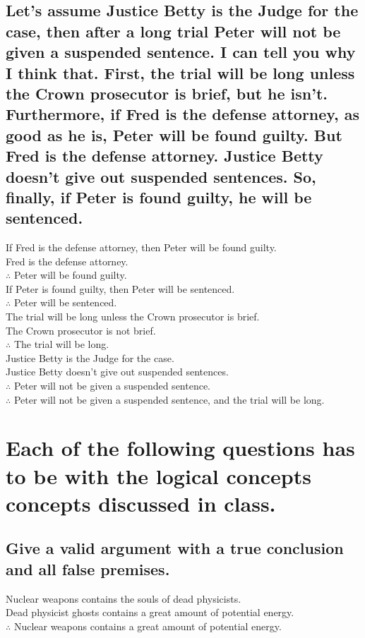 \documentclass[10pt, letterpaper, titlepage]{article}
\begin{document}
        \subsection{ Let’s assume Justice Betty is the Judge for the case, then after a long trial Peter
            will not be given a suspended sentence. I can tell you why I think that. First, the
            trial will be long unless the Crown prosecutor is brief, but he isn’t. Furthermore,
            if Fred is the defense attorney, as good as he is, Peter will be found guilty. But
            Fred is the defense attorney. Justice Betty doesn’t give out suspended sentences.
            So, finally, if Peter is found guilty, he will be sentenced.}
            If Fred is the defense attorney, then Peter will be found guilty.\\
            Fred is the defense attorney.\\
            $\therefore$ Peter will be found guilty.\\
            If Peter is found guilty, then Peter will be sentenced.\\
            $\therefore$ Peter will be sentenced.\\
            The trial will be long unless the Crown prosecutor is brief.\\
            The Crown prosecutor is not brief.\\
            $\therefore$ The trial will be long.\\
            Justice Betty is the Judge for the case.\\
            Justice Betty doesn't give out suspended sentences.\\
            $\therefore$ Peter will not be given a suspended sentence.\\
            $\therefore$ Peter will not be given a suspended sentence, and the trial will be long.
    

    \newpage
    \section{Each of the following questions has to be with the logical concepts concepts discussed
        in class.}
        \subsection{Give a valid argument with a true conclusion and all false premises.}
            Nuclear weapons contains the souls of dead physicists.\\
            Dead physicist ghosts contains a great amount of potential energy.\\
            $\therefore$ Nuclear weapons contains a great amount of potential energy.
\end{document}
